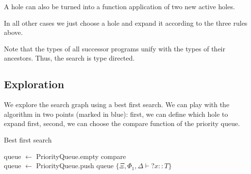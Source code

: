 \begin{prooftree}
\end{prooftree}

A hole can also be turned into a function application of two new active holes.
\begin{prooftree}
\end{prooftree}

In all other cases we just choose a hole and expand it according to the three rules above.
\begin{prooftree}
\end{prooftree}

Note that the types of all successor programs unify with the types of their ancestors. Thus, the search is type directed.


\subsection{Exploration}

We explore the search graph using a best first search.
We can play with the algorithm in two points (marked in blue): first, we can define which hole to expand first, second, we can choose the compare function of the priority queue.

\begin{algorithm}
\caption{Best first search}

queue $\gets$ PriorityQueue.empty {\color{blue}compare}\\
queue $\gets$ PriorityQueue.push queue $\{\Xi, \Phi_1, \Delta \vdash {?x} :: T\}$\\

\end{algorithm}

